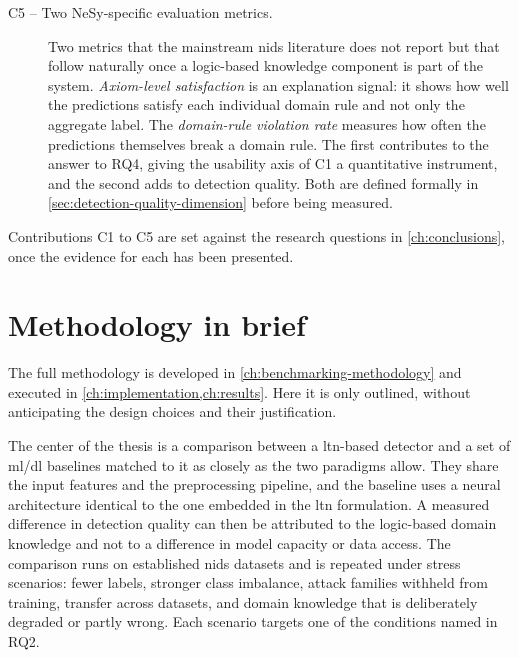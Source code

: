 \begin{description}
  \item[C5 -- Two NeSy-specific evaluation metrics.] Two metrics that the
    mainstream \gls{nids} literature does not report but that follow
    naturally once a logic-based knowledge component is part of the system.
    \emph{Axiom-level satisfaction} is an explanation signal: it shows how
    well the predictions satisfy each individual domain rule and not only
    the aggregate label. The \emph{domain-rule violation rate} measures how
    often the predictions themselves break a domain rule. The first
    contributes to the answer to RQ4, giving the usability axis of C1 a
    quantitative instrument, and the second adds to detection quality. Both
    are defined formally in \cref{sec:detection-quality-dimension} before
    being measured.
\end{description}

Contributions C1 to C5 are set against the research questions in
\cref{ch:conclusions}, once the evidence for each has been presented.

\section{Methodology in brief}
\label{sec:methodology-brief}

The full methodology is developed in \cref{ch:benchmarking-methodology} and
executed in \cref{ch:implementation,ch:results}. Here it is only outlined,
without anticipating the design choices and their justification.

The center of the thesis is a comparison between a \gls{ltn}-based detector
and a set of \gls{ml}/\gls{dl} baselines matched to it as closely as the two
paradigms allow. They share the input features and the preprocessing
pipeline, and the baseline uses a neural architecture identical to the one
embedded in the \gls{ltn} formulation. A measured difference in detection
quality can then be attributed to the logic-based domain knowledge and not
to a difference in model capacity or data access. The comparison runs on
established \gls{nids} datasets and is repeated under stress scenarios:
fewer labels, stronger class imbalance, attack families withheld from
training, transfer across datasets, and domain knowledge that is deliberately
degraded or partly wrong. Each scenario targets one of the conditions named
in RQ2.

